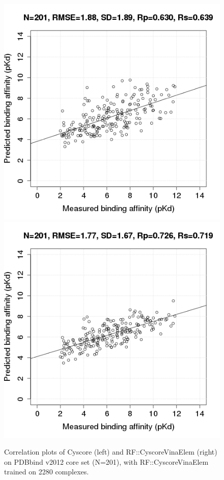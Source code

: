 \documentclass[journal=jacsat,manuscript=article]{achemso}
\begin{document}
\begin{figure}[h]
\includegraphics[width=1.4\linewidth,natwidth=480,natheight=480]{../rfcyscore/x4/mlr/trn-247-tst-201-yp.png}
\endminipage
{}
\includegraphics[width=1.4\linewidth,natwidth=480,natheight=480]{../rfcyscore/x46/rf/trn-2280-tst-201-yp.png}
\endminipage
\caption{Correlation plots of Cyscore (left) and RF::CyscoreVinaElem (right) on PDBbind v2012 core set (N=201), with RF::CyscoreVinaElem trained on 2280 complexes.}
\label{fig:tst201}
\end{figure}
\end{document}
